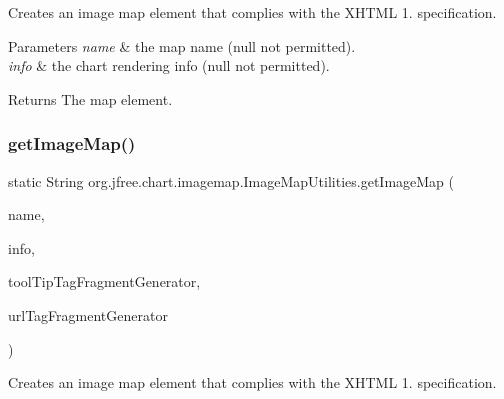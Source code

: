 Creates an image map element that complies with the X\+H\+T\+ML 1. specification.


\begin{DoxyParams}{Parameters}
{\em name} & the map name ({\ttfamily null} not permitted). \\
\hline
{\em info} & the chart rendering info ({\ttfamily null} not permitted).\\
\hline
\end{DoxyParams}
\begin{DoxyReturn}{Returns}
The map element. 
\end{DoxyReturn}
\mbox{\label{classorg_1_1jfree_1_1chart_1_1imagemap_1_1_image_map_utilities_a2adddae3d31eafb319b6e3ab6d2d43a4}} 
\subsubsection{\texorpdfstring{get\+Image\+Map()}{getImageMap()}\hspace{0.1cm}{\footnotesize\ttfamily [2/2]}}
{\footnotesize\ttfamily static String org.\+jfree.\+chart.\+imagemap.\+Image\+Map\+Utilities.\+get\+Image\+Map (\begin{DoxyParamCaption}\item[{String}]{name,  }\item[{\mbox{\hyperlink{classorg_1_1jfree_1_1chart_1_1_chart_rendering_info}{Chart\+Rendering\+Info}}}]{info,  }\item[{\mbox{\hyperlink{interfaceorg_1_1jfree_1_1chart_1_1imagemap_1_1_tool_tip_tag_fragment_generator}{Tool\+Tip\+Tag\+Fragment\+Generator}}}]{tool\+Tip\+Tag\+Fragment\+Generator,  }\item[{\mbox{\hyperlink{interfaceorg_1_1jfree_1_1chart_1_1imagemap_1_1_u_r_l_tag_fragment_generator}{U\+R\+L\+Tag\+Fragment\+Generator}}}]{url\+Tag\+Fragment\+Generator }\end{DoxyParamCaption})\hspace{0.3cm}{\ttfamily [static]}}

Creates an image map element that complies with the X\+H\+T\+ML 1. specification.


